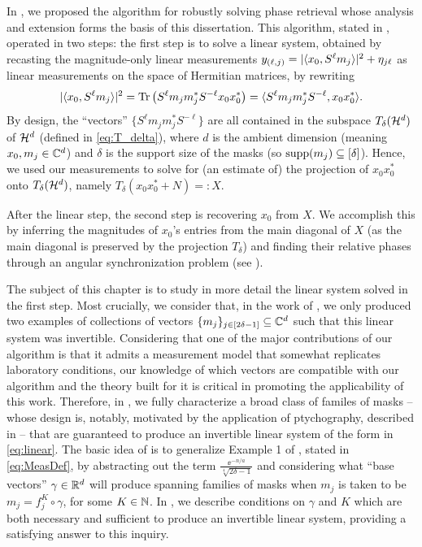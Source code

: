 In , we proposed the algorithm for robustly solving phase retrieval whose analysis and extension forms the basis of this dissertation.  This algorithm, stated in , operated in two steps: the first step is to solve a linear system, obtained by recasting the magnitude-only linear measurements $y_{(\ell, j)} = \lvert\langle x_0, S^{\ell} m_j\rangle\rvert^2 + \eta_{j \ell}$ as linear measurements on the space of Hermitian matrices, by rewriting \[\lvert\langle x_0, S^{\ell} m_j\rangle\rvert^2 = \operatorname{Tr}\left(S^{\ell} m_j m_j^* S^{- \ell} x_0 x_0^*\right) = \langle S^{\ell} m_j m_j^* S^{- \ell}, x_0 x_0^*\rangle.\]  By design, the ``vectors'' $\{S^{\ell} m_j m_j^* S^{- \ell}\}$ are all contained in the subspace $T_\delta(\mathcal{H}^d)$ of $\mathcal{H}^d$ (defined in \eqref{eq:T_delta}), where $d$ is the ambient dimension (meaning $x_0, m_j \in \mathbb{C}^d$) and $\delta$ is the support size of the masks (so $\operatorname{supp}(m_j) \subseteq [\delta]$).  Hence, we used our measurements to solve for (an estimate of) the projection of $x_0 x_0^*$ onto $T_\delta(\mathcal{H}^d)$, namely $T_\delta(x_0 x_0^* + N) =: X$.

After the linear step, the second step is recovering $x_0$ from $X$.  We accomplish this by inferring the magnitudes of $x_0$'s entries from the main diagonal of $X$ (as the main diagonal is preserved by the projection $T_\delta$) and finding their relative phases through an angular synchronization problem (see ).

The subject of this chapter is to study in more detail the linear system solved in the first step.  Most crucially, we consider that, in the work of , we only produced two examples of collections of vectors $\{m_j\}_{j \in [2 \delta - 1]} \subseteq \mathbb{C}^d$ such that this linear system was invertible.  Considering that one of the major contributions of our algorithm is that it admits a measurement model that somewhat replicates laboratory conditions, our knowledge of which vectors are compatible with our algorithm and the theory built for it is critical in promoting the applicability of this work.  Therefore, in , we fully characterize a broad class of familes of masks -- whose design is, notably, motivated by the application of ptychography, described in  -- that are guaranteed to produce an invertible linear system of the form in \eqref{eq:linear}.  The basic idea of  is to generalize Example 1 of , stated in \cref{eq:MeasDef}, by abstracting out the term $\frac{\ee^{-n/a}}{\sqrt[4]{2\delta -1}}$ and considering what ``base vectors'' $\gamma \in \mathbb{R}^d$ will produce spanning families of masks when $m_j$ is taken to be $m_j = f_j^K \circ \gamma$, for some $K \in \mathbb{N}$.  In , we describe conditions on $\gamma$ and $K$ which are both necessary and sufficient to produce an invertible linear system, providing a satisfying answer to this inquiry.

